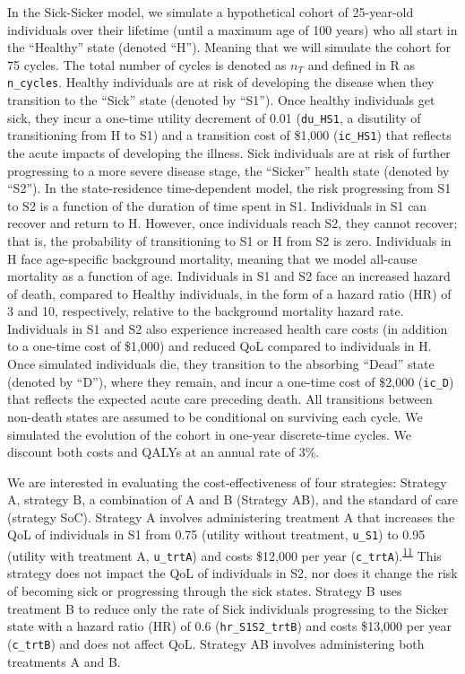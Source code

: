 \documentclass[
]{article}
\begin{document}
In the Sick-Sicker model, we simulate a hypothetical cohort of 25-year-old individuals over their lifetime (until a maximum age of 100 years) who all start in the ``Healthy'' state (denoted ``H''). Meaning that we will simulate the cohort for 75 cycles. The total number of cycles is denoted as \(n_T\) and defined in R as \texttt{n\_cycles}. Healthy individuals are at risk of developing the disease when they transition to the ``Sick'' state (denoted by ``S1''). Once healthy individuals get sick, they incur a one-time utility decrement of 0.01 (\texttt{du\_HS1}, a disutility of transitioning from H to S1) and a transition cost of \$1,000 (\texttt{ic\_HS1}) that reflects the acute impacts of developing the illness. Sick individuals are at risk of further progressing to a more severe disease stage, the ``Sicker'' health state (denoted by ``S2''). In the state-residence time-dependent model, the risk progressing from S1 to S2 is a function of the duration of time spent in S1. Individuals in S1 can recover and return to H. However, once individuals reach S2, they cannot recover; that is, the probability of transitioning to S1 or H from S2 is zero. Individuals in H face age-specific background mortality, meaning that we model all-cause mortality as a function of age. Individuals in S1 and S2 face an increased hazard of death, compared to Healthy individuals, in the form of a hazard ratio (HR) of 3 and 10, respectively, relative to the background mortality hazard rate. Individuals in S1 and S2 also experience increased health care costs (in addition to a one-time cost of \$1,000) and reduced QoL compared to individuals in H. Once simulated individuals die, they transition to the absorbing ``Dead'' state (denoted by ``D''), where they remain, and incur a one-time cost of \$2,000 (\texttt{ic\_D}) that reflects the expected acute care preceding death. All transitions between non-death states are assumed to be conditional on surviving each cycle. We simulated the evolution of the cohort in one-year discrete-time cycles. We discount both costs and QALYs at an annual rate of 3\%.

We are interested in evaluating the cost-effectiveness of four strategies: Strategy A, strategy B, a combination of A and B (Strategy AB), and the standard of care (strategy SoC). Strategy A involves administering treatment A that increases the QoL of individuals in S1 from 0.75 (utility without treatment, \texttt{u\_S1}) to 0.95 (utility with treatment A, \texttt{u\_trtA}) and costs \$12,000 per year (\texttt{c\_trtA}).\textsuperscript{\protect\hyperlink{ref-Krijkamp2018}{11}} This strategy does not impact the QoL of individuals in S2, nor does it change the risk of becoming sick or progressing through the sick states. Strategy B uses treatment B to reduce only the rate of Sick individuals progressing to the Sicker state with a hazard ratio (HR) of 0.6 (\texttt{hr\_S1S2\_trtB}) and costs \$13,000 per year (\texttt{c\_trtB}) and does not affect QoL. Strategy AB involves administering both treatments A and B.
\end{document}
